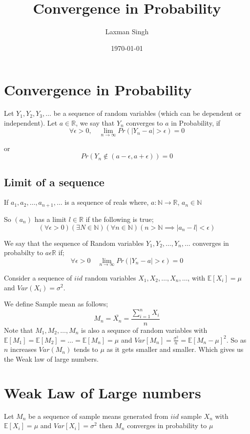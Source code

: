 \documentclass[12pt,a4paper]{article}
\author{Laxman Singh}
\date{\today}
\title{Convergence in Probability}
\begin{document}
 \section*{Convergence in Probability}
    Let \(Y_{1},Y_{2},Y_{3},\ldots\) be a sequence of random variables (which can be dependent or independent). Let \(a \in \mathbb{R}\), we say that \(Y_{n}\) converges to $a$ in Probability, if \[\forall \epsilon > 0,\quad \lim_{n\to \infty} Pr\left( |Y_{n}-a|>\epsilon  \right) =0 \]
    
    or
    \begin{equation*}
        Pr\left( Y_{n} \notin \left( a-\epsilon,a+\epsilon \right)  \right)=0 
    \end{equation*} 
  \subsection{Limit of a sequence } 
    If \(a_{1},a_{2},\ldots,a_{n+1},\ldots\) is a sequence of reals where,
    \(a: \mathbb{N}\to \mathbb{R}\), \(a_{n}\in \mathbb{N}\)
    
    So \(\left( a_{n} \right) \) has a limit \(l\in \mathbb{R}\) if the following is true;
    \begin{equation*}
    \left( \forall \epsilon > 0 \right) \left( \exists N \in \mathbb{N}\right) \left( \forall n \in \mathbb{N} \right) \left( n>\mathbb{N} \implies |a_{n}-l|<\epsilon \right) 
    \end{equation*}    

    We say that the sequence of Random variables \(Y_{1},Y_{2},\ldots,Y_{n},\ldots\) converges in probabilty to \(a \epsilon \mathbb{R}\) if;
    \begin{equation*}
        \forall \epsilon >0 \quad \lim_{n\to \infty} Pr \left( |Y_{n}-a|>\epsilon \right) =0
    \end{equation*}    
    
    Consider a sequence of \(iid\) random variables \(X_{1},X_{2},\ldots,X_{n},\ldots\), with \(\mathbb{E}[X_{i}]=\mu\) and \(Var\left( X_{i} \right)=\sigma^2 \). 
    
    We define Sample mean as follows;
    \begin{equation*}
        M_{n}=\bar{X_{n}}=\frac{\sum_{i=1}^{n}X_{i} }{n}    
    \end{equation*}
    Note that \(M_{1},M_{2},\ldots,M_{n}\) is also a sequnce of random variables with \(\mathbb{E}[M_{1}]=\mathbb{E}[M_{2}]=\ldots=\mathbb{E}[M_{n}]=\mu\) and \(Var[M_{n}]=\frac{\sigma^2}{n}=\mathbb{E}[M_{n}-\mu]^2\). 
    So as \(n\) increases \(Var(M_{n})\) tends to \(\mu\) as it gets smaller and smaller. Which gives us the Weak law of large numbers. 
    
    \section*{Weak Law of Large numbers}
     Let \(M_{n}\) be a sequence of sample means generated from \(iid\)  sample \(X_{n}\) with \(\mathbb{E}[X_{i}]=\mu \) and \(Var[X_{i}]=\sigma^2 \) then \(M_{n}\) converges in probability to \(\mu\)             

    
\end{document}
